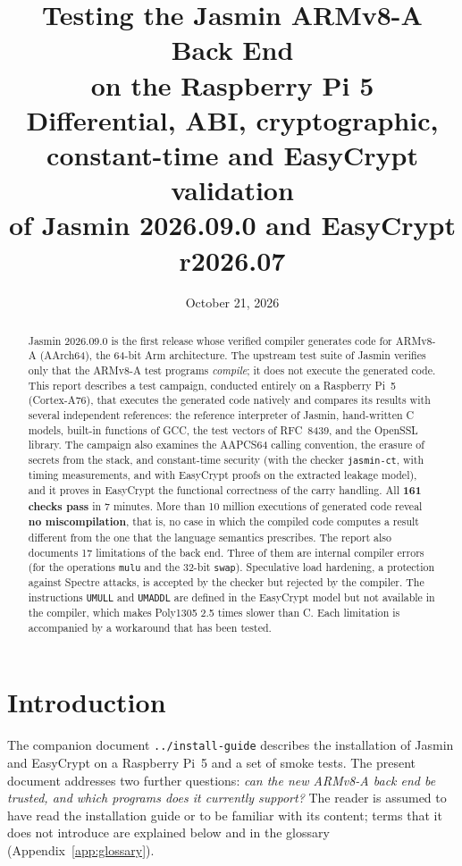 \documentclass[11pt,a4paper]{article}
\title{\textbf{Testing the Jasmin ARMv8-A Back End\\on the Raspberry Pi 5}\\[4pt]
  \large Differential, ABI, cryptographic, constant-time and EasyCrypt validation\\
  of Jasmin 2026.09.0 and EasyCrypt r2026.07}
\author{}
\date{October 21, 2026}
\newcommand{\file}[1]{\texttt{#1}}
\begin{document}
\maketitle
\thispagestyle{empty}

\begin{abstract}
\noindent
Jasmin 2026.09.0 is the first release whose verified compiler generates
code for ARMv8-A (AArch64), the 64-bit Arm architecture. The upstream test
suite of Jasmin verifies only that the ARMv8-A test programs
\emph{compile}; it does not execute the generated code. This report
describes a test campaign, conducted entirely on a Raspberry Pi~5
(Cortex-A76), that executes the generated code natively and compares its
results with several independent references: the reference interpreter of
Jasmin, hand-written C models, built-in functions of GCC, the test vectors
of RFC~8439, and the OpenSSL library. The campaign also examines the
AAPCS64 calling convention, the erasure of secrets from the stack, and
constant-time security (with the checker \texttt{jasmin-ct}, with timing
measurements, and with EasyCrypt proofs on the extracted leakage model), and
it proves in EasyCrypt the functional correctness of the carry handling.
All \textbf{161 checks pass} in 7 minutes. More than 10 million executions
of generated code reveal \textbf{no miscompilation}, that is, no case in
which the compiled code computes a result different from the one that the
language semantics prescribes. The report also documents 17 limitations of
the back end. Three of them are internal compiler errors (for the
operations \texttt{mulu} and the 32-bit \texttt{swap}). Speculative load
hardening, a protection against Spectre attacks, is accepted by the checker
but rejected by the compiler. The instructions \texttt{UMULL} and
\texttt{UMADDL} are defined in the EasyCrypt model but not available in the
compiler, which makes Poly1305 2.5 times slower than C. Each limitation is
accompanied by a workaround that has been tested.
\end{abstract}

\tableofcontents
\newpage

\section{Introduction}

The companion document \file{../install-guide} describes the installation of
Jasmin and EasyCrypt on a Raspberry Pi~5 and a set of smoke tests. The
present document addresses two further questions: \emph{can the new ARMv8-A
back end be trusted, and which programs does it currently support?} The
reader is assumed to have read the installation guide or to be familiar with
its content; terms that it does not introduce are explained below and in the
glossary (Appendix~\ref{app:glossary}).
\end{document}
